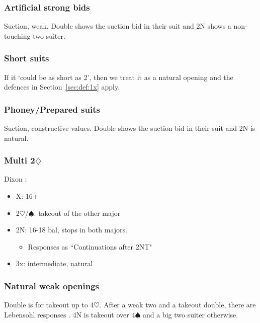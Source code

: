 \documentclass[a4paper,14pt]{extarticle}
\begin{document}
\subsubsection{Artificial strong bids}
\label{sec:def:strong}

Suction, weak. Double shows the suction bid in their suit and 2N shows a
non-touching two suiter. 

\subsubsection{Short suits}
\label{sec:def:short}

If it `could be as short as 2', then we treat it as a natural opening and the
defences in Section~\ref{sec:def:1x} apply.

\subsubsection{Phoney/Prepared suits}
\label{sec:def:phoney}

Suction, constructive values. Double shows the suction bid in their suit and 2N
is natural. 

\newpage 

\subsubsection{Multi 2$\diamondsuit$}
\label{sec:def:multi}

Dixon :

\begin{itemize}
\item X: 16+
\item 2$\heartsuit$/$\spadesuit$: takeout of the other major
\item 2N: 16-18 bal, stops in both majors.
	\begin{itemize}
	\item Responses as ``Continuations after 2NT" 
	\end{itemize}
\item 3x: intermediate, natural
\end{itemize}

\subsubsection{Natural weak openings}
\label{sec:def:weak}

Double is for takeout up to 4$\heartsuit$. After a weak two and a takeout double, there
are Lebensohl responses . 4N is takeout over 4$\spadesuit$ and a big two suiter otherwise.
\end{document}
